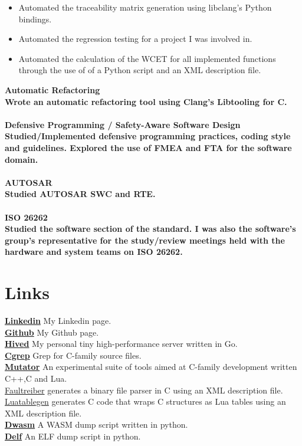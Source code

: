 \documentclass[8pt]{article}
\begin{document}
\begin{multicols}{2}
\begin{itemize}
\item Automated the traceability matrix generation using libclang's Python bindings.
\item Automated the regression testing for a project I was involved in.
\item Automated the calculation of the WCET for all implemented functions through the use of of a Python script and an XML description file.
  \end{itemize}
  \bf Automatic Refactoring\\ \normalfont Wrote an automatic refactoring tool using Clang's Libtooling for C.\\[5pt]
  \\
  \bf Defensive Programming / Safety-Aware Software Design\\ \normalfont Studied/Implemented defensive programming practices, coding style and guidelines. Explored the use of FMEA and FTA for the software domain.\\[5pt]
  \\
  \bf AUTOSAR\\ \normalfont Studied AUTOSAR SWC and RTE.\\[5pt]
  \\
  \bf ISO 26262\\ \normalfont Studied the software section of the standard. I was also the software's group's representative for the study/review meetings held with the hardware and system teams on ISO 26262.\\[5pt]

  \section*{Links}
  {\bf \href{https://ir.linkedin.com/in/farzad-sadeghi-08426277}{Linkedin}} My Linkedin page.\\[5pt]
  {\bf \href{https://github.com/terminaldweller}{Github}} My Github page.\\[5pt]
  {\bf \href{https://github.com/terminaldweller/hived}{Hived}} My personal tiny high-performance server written in Go.\\[5pt]
  {\bf \href{https://github.com/terminaldweller/cgrep}{Cgrep}} Grep for C-family source files.\\[5pt]
  {\bf \href{https://terminaldweller.github.io/mutator/}{Mutator}} An experimental suite of tools aimed at C-family development written C++,C and Lua.\\[5pt]
  \href{https://github.com/terminaldweller/faultreiber}{Faultreiber} generates a binary file parser in C using an XML description file.\\[5pt]
  \href{https://github.com/terminaldweller/luatablegen}{Luatablegen} generates C code that wraps C structures as Lua tables using an XML description file.\\[5pt]
  {\bf \href{https://github.com/terminaldweller/dwasm}{Dwasm}} A WASM dump script written in python.\\[5pt]
  {\bf \href{https://github.com/terminaldweller/delf}{Delf}} An ELF dump script in python.\\[5pt]


\end{multicols}
\end{document}
